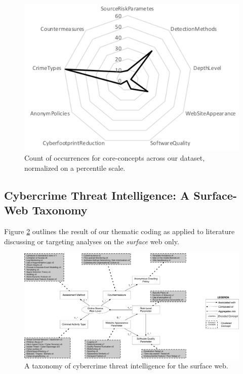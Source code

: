 \begin{figure}
\begin{center}
\includegraphics[scale=0.4]{./img/codescount.png}
\end{center}
\caption{Count of occurrences for core-concepts across our dataset, normalized on a percentile scale.}\label{codescount}
\end{figure}

\subsection{Cybercrime Threat Intelligence: A Surface-Web Taxonomy}

Figure \ref{taxo1} outlines the result of our thematic coding as applied to literature discussing or targeting analyses on the \emph{surface} web only.

\begin{figure}
\begin{center}
\includegraphics[scale=0.3]{./img/taxo1.pdf}
\end{center}
\caption{A taxonomy of cybercrime threat intelligence for the surface web.}\label{taxo1}
\end{figure}



